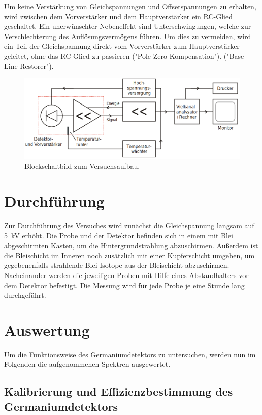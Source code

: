 Um keine Verstärkung von Gleichspannungen und Offsetspannungen zu erhalten, wird
zwischen dem Vorverstärker und dem Hauptverstärker ein RC-Glied geschaltet. Ein
unerwünschter Nebeneffekt sind Unterschwingungen, welche zur Verschlechterung
des Auflösungsvermögens führen. Um dies zu vermeiden, wird ein Teil der
Gleichspannung direkt vom Vorverstärker zum Hauptverstärker geleitet, ohne das
RC-Glied zu passieren ("Pole-Zero-Kompensation"). 
("Base-Line-Restorer").

\begin{figure}
  \centering
  \includegraphics[scale=0.4]{Aufbau.png}
  \caption{Blockschaltbild zum Versuchsaufbau. \cite{Q1}}
  \label{abb:2}
\end{figure}



\section{Durchführung}
Zur Durchführung des Versuches wird zunächst die Gleichspannung langsam auf \SI{5}{\kilo\volt}
erhöht.
Die Probe und der Detektor befinden sich in einem mit Blei abgeschirmten Kasten,
um die Hintergrundstrahlung abzuschirmen. Außerdem ist die Bleischicht im Inneren
noch zusätzlich mit einer Kupferschicht umgeben, um gegebenenfalls strahlende
Blei-Isotope aus der Bleischicht abzuschirmen.
Nacheinander werden die jeweiligen Proben mit Hilfe eines Abstandhalters
vor dem Detektor befestigt. Die Messung wird für jede Probe je eine Stunde lang
durchgeführt.

\section{Auswertung}
Um die Funktionsweise des Germaniumdetektors zu untersuchen, werden nun im Folgenden die aufgenommenen Spektren ausgewertet.

\subsection{Kalibrierung und Effizienzbestimmung des Germaniumdetektors}

